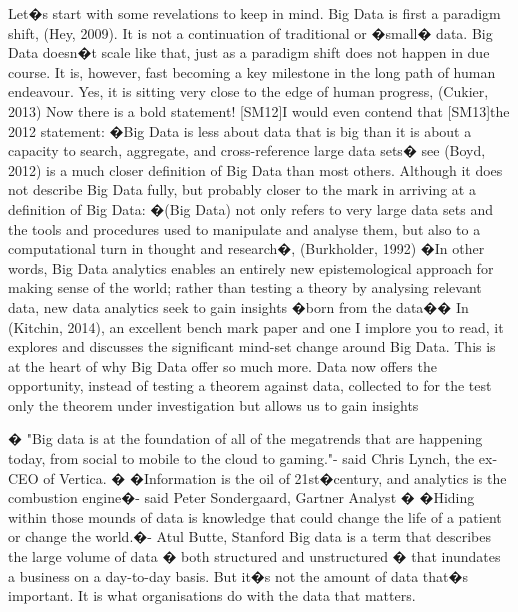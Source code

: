 \documentclass{book}
\begin{document}
Let�s start with some revelations to keep in mind.  Big Data is first a paradigm shift,  (Hey, 2009). It is not a continuation of traditional or �small� data.  Big Data doesn�t scale like that, just as a paradigm shift does not happen in due course.  It is, however, fast becoming a key milestone in the long path of human endeavour.  Yes, it is sitting very close to the edge of human progress, (Cukier, 2013)  Now there is a bold statement!  [SM12]I would even contend that [SM13]the 2012 statement:  �Big Data is less about data that is big than it is about a capacity to search, aggregate, and cross-reference large data sets� see (Boyd, 2012)  is a much closer definition of Big Data than most others.  Although it does not describe Big Data fully, but probably closer to the mark in arriving at a definition of Big Data: �(Big Data) not only refers to very large data sets and the tools and procedures used to manipulate and analyse them, but also to a computational turn in thought and research�, (Burkholder, 1992)
 �In other words, Big Data analytics enables an entirely new epistemological approach for making sense of the world; rather than testing a theory by analysing relevant data, new data analytics seek to gain insights �born from the data��  In (Kitchin, 2014), an excellent bench mark paper and one I implore you to read, it explores and discusses the significant mind-set change around Big Data.  This is at the heart of why Big Data offer so much more.   Data now offers the opportunity, instead of testing a theorem against data, collected to for the test only the theorem under investigation but allows us to gain insights 

� "Big data is at the foundation of all of the megatrends that are happening today, from social to mobile to the cloud to gaming."- said Chris Lynch, the ex-CEO of Vertica. 
� �Information is the oil of 21st�century, and analytics is the combustion engine�- said Peter Sondergaard, Gartner Analyst 
� �Hiding within those mounds of data is knowledge that could change the life of a patient or change the world.�- Atul Butte, Stanford
Big data is a term that describes the large volume of data � both structured and unstructured � that inundates a business on a day-to-day basis. But it�s not the amount of data that�s important. It is what organisations do with the data that matters. 
\end{document}
